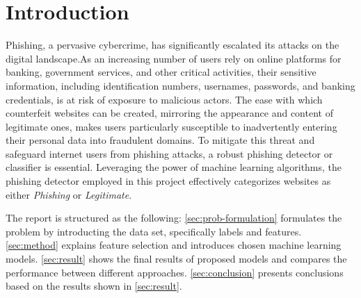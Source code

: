 \section{Introduction}
Phishing, a pervasive cybercrime, has significantly escalated its attacks on the
digital landscape.As an increasing number of users rely on online platforms for
banking, government services, and other critical activities, their sensitive
information, including identification numbers, usernames, passwords, and banking
credentials, is at risk of exposure to malicious actors. The ease with which
counterfeit websites can be created, mirroring the appearance and content of
legitimate ones, makes users particularly susceptible to inadvertently entering
their personal data into fraudulent domains. To mitigate this threat and safeguard
internet users from phishing attacks, a robust phishing detector or classifier is
essential. Leveraging the power of machine learning algorithms, the phishing detector
employed in this project effectively categorizes websites as either
\emph{Phishing} or \emph{Legitimate}.

The report is structured as the following: \autoref{sec:prob-formulation} formulates
the problem by introducting the data set, specifically labels and features.
\autoref{sec:method} explains feature selection and introduces chosen
machine learning models. \autoref{sec:result} shows the final results of
proposed models and compares the performance between different approaches.
\autoref{sec:conclusion} presents conclusions based on the results shown
in \autoref{sec:result}.